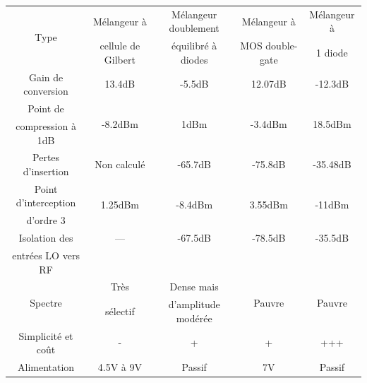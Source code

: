 \documentclass{article}
\begin{document}




\begin{tabular}{|c||c|c|c|c|}
\hline  \multirow{2}{*}{Type} & Mélangeur à & Mélangeur doublement & Mélangeur à &  Mélangeur à \\
							  & cellule de Gilbert & équilibré à diodes & MOS double-gate & 1 diode \\
\hline
\hline  Gain de conversion & 13.4dB &  -5.5dB & 12.07dB &  -12.3dB \\
\hline  Point de          & \multirow{2}{*}{-8.2dBm} & \multirow{2}{*}{1dBm} & \multirow{2}{*}{-3.4dBm} & \multirow{2}{*}{18.5dBm} \\
		compression à 1dB & &&&\\
\hline  Pertes d'insertion & Non calculé & -65.7dB & -75.8dB & -35.48dB \\
\hline  Point d'interception & \multirow{2}{*}{1.25dBm} & \multirow{2}{*}{-8.4dBm} & \multirow{2}{*}{3.55dBm} & \multirow{2}{*}{-11dBm} \\
		d'ordre 3            & &&&\\
\hline  Isolation des & --- & -67.5dB & -78.5dB & -35.5dB \\
\hline  entrées LO vers RF & &&&\\
\hline  \multirow{2}{*}{Spectre} & Très & Dense mais & \multirow{2}{*}{Pauvre} & \multirow{2}{*}{Pauvre} \\
								 & sélectif & d'amplitude modérée &&\\
\hline  Simplicité et coût & - & + & + & +++ \\
\hline  Alimentation & 4.5V à 9V & Passif & 7V & Passif \\
\hline
\end{tabular}
\end{document}

